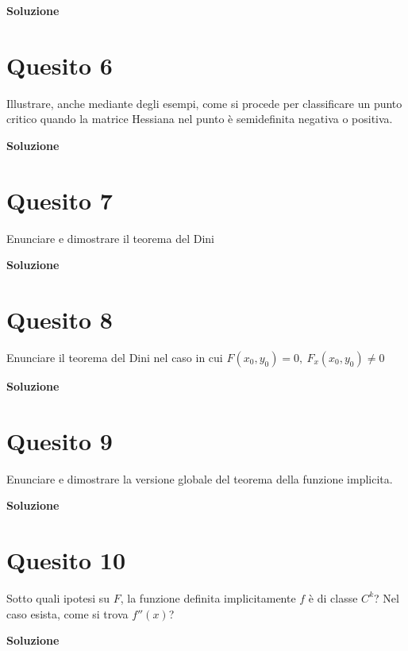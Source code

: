 \medskip
\begin{large}
\textbf{Soluzione}
\end{large}


\section*{Quesito 6}
Illustrare, anche mediante degli esempi, come si procede per classificare un
punto critico quando la matrice Hessiana nel punto è semidefinita negativa o positiva.

\medskip
\begin{large}
\textbf{Soluzione}
\end{large}


\section*{Quesito 7}
Enunciare e dimostrare il teorema del Dini

\medskip
\begin{large}
\textbf{Soluzione}
\end{large}


\section*{Quesito 8}
Enunciare il teorema del Dini nel caso in cui $F(x_0,y_0)=0, \: F_x(x_0,y_0)\neq 0$

\medskip
\begin{large}
\textbf{Soluzione}
\end{large}


\section*{Quesito 9}
Enunciare e dimostrare la versione globale del teorema della funzione implicita.

\medskip
\begin{large}
\textbf{Soluzione}
\end{large}


\section*{Quesito 10}
Sotto quali ipotesi su $F$, la funzione definita implicitamente $f$ è di classe $C^k$?
Nel caso esista, come si trova $f''(x)$?

\medskip
\begin{large}
\textbf{Soluzione}
\end{large}
